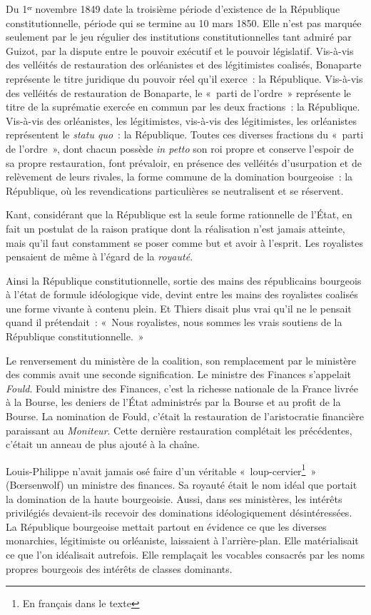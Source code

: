 \documentclass[french,twoside]{book} %
\begin{document}
Du 1ᵉʳ novembre 1849 date la troisième période d’existence de la République constitutionnelle, période qui se termine au 10 mars 1850. Elle n’est pas marquée seulement par le jeu régulier des institutions constitutionnelles tant admiré par Guizot, par la dispute entre le pouvoir exécutif et le pouvoir législatif. Vis-à-vis des velléités de restauration des orléanistes et des légitimistes coalisés, Bonaparte représente le titre juridique du pouvoir réel qu’il exerce : la République. Vis-à-vis des velléités de restauration de Bonaparte, le « parti de l’ordre » représente le titre de la suprématie exercée en commun par les deux fractions : la République. Vis-à-vis des orléanistes, les légitimistes, vis-à-vis des légitimistes, les orléanistes représentent le \emph{statu quo} : la République. Toutes ces diverses fractions du « parti de l’ordre », dont chacun possède \emph{in petto} son roi propre et conserve l’espoir de sa propre restauration, font prévaloir, en présence des velléités d’usurpation et de relèvement de leurs rivales, la forme commune de la domination bourgeoise : la République, où les revendications particulières se neutralisent et se réservent.\par
Kant, considérant que la République est la seule forme rationnelle de l’État, en fait un postulat de la raison pratique dont la réalisation n’est jamais atteinte, mais qu’il faut constamment se poser comme but et avoir à l’esprit. Les royalistes pensaient de même à l’égard de la \emph{royauté}.\par
Ainsi la République constitutionnelle, sortie des mains des républicains bourgeois à l’état de formule idéologique vide, devint entre les mains des royalistes coalisés une forme vivante à contenu plein. Et Thiers disait plus vrai qu’il ne le pensait quand il prétendait : « Nous royalistes, nous sommes les vrais soutiens de la République constitutionnelle. »\par
Le renversement du ministère de la coalition, son remplacement par le ministère des commis avait une seconde signification. Le ministre des Finances s’appelait \emph{Fould}. Fould ministre des Finances, c’est la richesse nationale de la France livrée à la Bourse, les deniers de l’État administrés par la Bourse et au profit de la Bourse. La nomination de Fould, c’était la restauration de l’aristocratie financière paraissant au \emph{Moniteur}. Cette dernière restauration complétait les précédentes, c’était un anneau de plus ajouté à la chaîne.\par
Louis-Philippe n’avait jamais osé faire d’un véritable « loup-cervier\footnote{En français dans le texte} » (Bœrsenwolf) un ministre des finances. Sa royauté était le nom idéal que portait la domination de la haute bourgeoisie. Aussi, dans ses ministères, les intérêts privilégiés devaient-ils recevoir des dominations idéologiquement désintéressées. La République bourgeoise mettait partout en évidence ce que les diverses monarchies, légitimiste ou orléaniste, laissaient à l’arrière-plan. Elle matérialisait ce que l’on idéalisait autrefois. Elle remplaçait les vocables consacrés par les noms propres bourgeois des intérêts de classes dominants.\par
\end{document}
